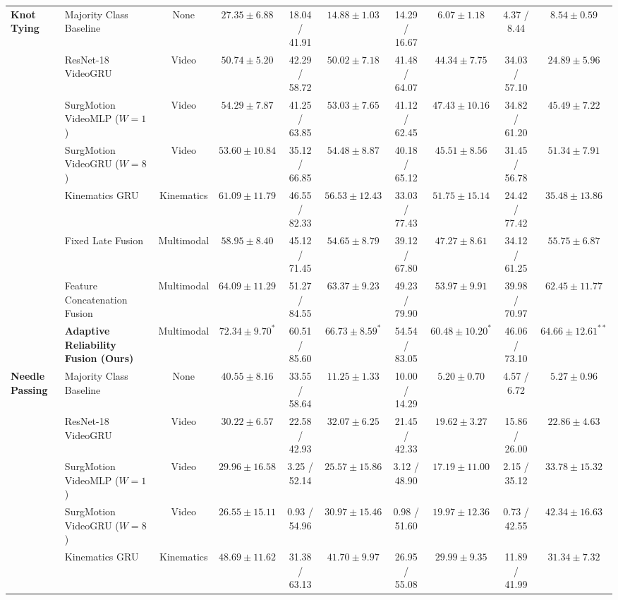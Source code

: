 \documentclass[10pt,journal]{IEEEtran}
\begin{document}
\begin{table}[t]
{\begin{tabular}{llcccccccc}
\midrule
\multirow{8}{*}{\textbf{Knot Tying}}
& Majority Class Baseline & None & $27.35 \pm 6.88$ & 18.04 / 41.91 & $14.88 \pm 1.03$ & 14.29 / 16.67 & $6.07 \pm 1.18$ & 4.37 / 8.44 & $8.54 \pm 0.59$ \\
& ResNet-18 VideoGRU & Video & $50.74 \pm 5.20$ & 42.29 / 58.72 & $50.02 \pm 7.18$ & 41.48 / 64.07 & $44.34 \pm 7.75$ & 34.03 / 57.10 & $24.89 \pm 5.96$ \\
& SurgMotion VideoMLP ($W=1$) & Video & $54.29 \pm 7.87$ & 41.25 / 63.85 & $53.03 \pm 7.65$ & 41.12 / 62.45 & $47.43 \pm 10.16$ & 34.82 / 61.20 & $45.49 \pm 7.22$ \\
& SurgMotion VideoGRU ($W=8$) & Video & $53.60 \pm 10.84$ & 35.12 / 66.85 & $54.48 \pm 8.87$ & 40.18 / 65.12 & $45.51 \pm 8.56$ & 31.45 / 56.78 & $51.34 \pm 7.91$ \\
& Kinematics GRU & Kinematics & $61.09 \pm 11.79$ & 46.55 / 82.33 & $56.53 \pm 12.43$ & 33.03 / 77.43 & $51.75 \pm 15.14$ & 24.42 / 77.42 & $35.48 \pm 13.86$ \\
& Fixed Late Fusion & Multimodal & $58.95 \pm 8.40$ & 45.12 / 71.45 & $54.65 \pm 8.79$ & 39.12 / 67.80 & $47.27 \pm 8.61$ & 34.12 / 61.25 & $55.75 \pm 6.87$ \\
& Feature Concatenation Fusion & Multimodal & $64.09 \pm 11.29$ & 51.27 / 84.55 & $63.37 \pm 9.23$ & 49.23 / 79.90 & $53.97 \pm 9.91$ & 39.98 / 70.97 & $62.45 \pm 11.77$ \\
& \textbf{Adaptive Reliability Fusion (Ours)} & Multimodal & $\mathbf{72.34 \pm 9.70}^{*}$ & 60.51 / 85.60 & $\mathbf{66.73 \pm 8.59}^{*}$ & 54.54 / 83.05 & $\mathbf{60.48 \pm 10.20}^{*}$ & 46.06 / 73.10 & $\mathbf{64.66 \pm 12.61}^{**}$ \\
\midrule
\multirow{8}{*}{\textbf{Needle Passing}}
& Majority Class Baseline & None & $40.55 \pm 8.16$ & 33.55 / 58.64 & $11.25 \pm 1.33$ & 10.00 / 14.29 & $5.20 \pm 0.70$ & 4.57 / 6.72 & $5.27 \pm 0.96$ \\
& ResNet-18 VideoGRU & Video & $30.22 \pm 6.57$ & 22.58 / 42.93 & $32.07 \pm 6.25$ & 21.45 / 42.33 & $19.62 \pm 3.27$ & 15.86 / 26.00 & $22.86 \pm 4.63$ \\
& SurgMotion VideoMLP ($W=1$) & Video & $29.96 \pm 16.58$ & 3.25 / 52.14 & $25.57 \pm 15.86$ & 3.12 / 48.90 & $17.19 \pm 11.00$ & 2.15 / 35.12 & $33.78 \pm 15.32$ \\
& SurgMotion VideoGRU ($W=8$) & Video & $26.55 \pm 15.11$ & 0.93 / 54.96 & $30.97 \pm 15.46$ & 0.98 / 51.60 & $19.97 \pm 12.36$ & 0.73 / 42.55 & $42.34 \pm 16.63$ \\
& Kinematics GRU & Kinematics & $48.69 \pm 11.62$ & 31.38 / 63.13 & $41.70 \pm 9.97$ & 26.95 / 55.08 & $29.99 \pm 9.35$ & 11.89 / 41.99 & $31.34 \pm 7.32$ \\

\end{tabular}}
\end{table}
\end{document}
